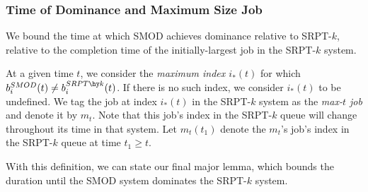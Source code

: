 \documentclass[acmsmall]{acmart}
\begin{document}
\subsubsection{Time of Dominance and Maximum Size Job}
\label{sec:time-of-dominance}

We bound the time at which SMOD achieves dominance relative to SRPT-$k$, relative to the completion time of the initially-largest job  in the SRPT-$k$ system.

\begin{definition}    
At a given time $t$, we consider the \textit{maximum index $i_*(t)$} for which $b_i^{SMOD}(t) \neq b_i^{SRPT\hy k}(t)$.
If there is no such index, we consider $i_*(t)$ to be undefined.
We tag the job at index $i_*(t)$ in the SRPT-$k$ system as the \textit{max-$t$ job} and denote it by $m_t$.
Note that this job's index in the SRPT-$k$ queue will change throughout its time in that system.
Let $m_t(t_1)$ denote the $m_t$'s job's index in the SRPT-$k$ queue at time $t_1 \ge t$.
\end{definition}

With this definition, we can state our final major lemma, which bounds the duration until the SMOD system dominates the SRPT-$k$ system.
\end{document}
